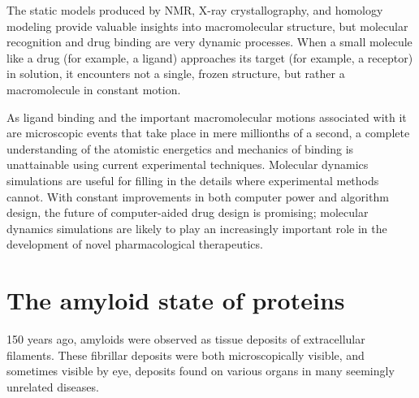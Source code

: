 
The static models produced by NMR, X-ray crystallography, and homology modeling provide valuable insights into macromolecular structure, but molecular recognition and drug binding are very dynamic processes. 
When a small molecule like a drug (for example, a ligand) approaches its target (for example, a receptor) in solution, it encounters not a single, frozen structure, but rather a macromolecule in constant motion.

As ligand binding and the important macromolecular motions associated with it are microscopic events that take place in mere millionths of a second, a complete understanding of the atomistic energetics and mechanics of binding is unattainable using current experimental techniques. Molecular dynamics simulations are useful for filling in the details where experimental methods cannot. With constant improvements in both computer power and algorithm design, the future of computer-aided drug design is promising; molecular dynamics simulations are likely to play an increasingly important role in the development of novel pharmacological therapeutics.\cite{Durrant:2011bm}


\section{The amyloid state of proteins}

150 years ago, amyloids were observed as tissue deposits of extracellular filaments.\cite{Haass:2007db,Sipe:2000fs} These fibrillar deposits were both microscopically visible, and sometimes visible by eye, deposits found on various organs in many seemingly unrelated diseases.

